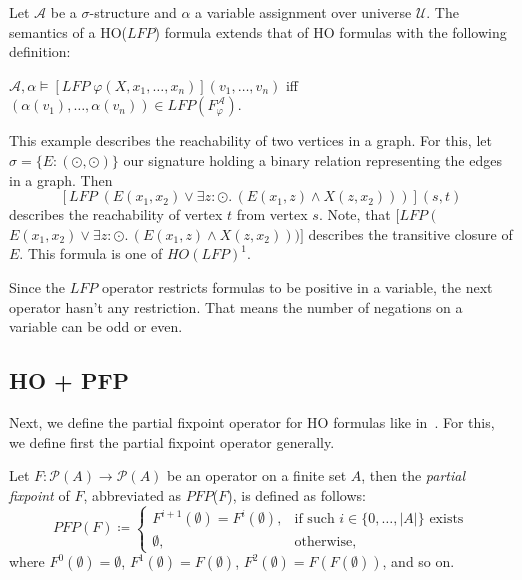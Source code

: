 \begin{definition}
    Let $\mathcal{A}$ be a $\sigma$-structure and $\alpha$ a variable assignment over universe $\mathcal{U}$. The
    semantics of a HO($\mathit{LFP}$) formula extends that of HO formulas with the following definition:
    \begin{compactitem}
        \item $\mathcal{A}, \alpha \models [\mathit{LFP}\;\varphi(X, x_1, \dots, x_n)](v_1, \dots,
        v_n)$ iff $(\alpha(v_1), \dots, \alpha(v_n)) \in \mathit{LFP}(F_\varphi^\mathcal{A})$.
    \end{compactitem}
\end{definition}

\begin{example}{\cite{freireMartins2011descriptive}}
    \label{example:ho_lfp} This example describes the reachability of two
    vertices in a graph. For this, let $\sigma = \{E\colon(\odot, \odot)\}$ our signature holding a binary relation
    representing the edges in a graph. Then
    \[[LFP\;(E(x_1, x_2) \vee \exists z\colon\odot.\,(E(x_1, z) \wedge X(z, x_2)))](s, t)\]
    describes the reachability of vertex $t$ from vertex $s$. Note, that $[LFP\;($ $E(x_1, x_2) \vee
    \exists z\colon\odot.\,(E(x_1, z) \wedge X(z, x_2)))]$ describes the transitive closure of $E$. This formula is
    one of $HO(LFP)^1$.
\end{example}

Since the $\mathit{LFP}$ operator restricts formulas to be positive in a variable, the next operator hasn't any
restriction. That means the number of negations on a variable can be odd or even.

\subsection{HO + PFP}\label{subsec:ho+Pfp}

Next, we define the partial fixpoint operator for HO formulas like in~\cite{schewe2006fixpoint}. For this, we define
first the partial fixpoint operator generally.

\begin{definition}
    Let $F\colon \mathscr{P}(A) \rightarrow \mathscr{P}(A)$ be an operator on a finite set $A$, then the \emph{partial
    fixpoint} of $F$, abbreviated as $\mathit{PFP}$($F$), is defined as follows:
    \[\mathit{PFP}(F)\coloneqq\begin{cases}
               F^{i+1}(\emptyset)=F^i(\emptyset),  & \text{if such } i \in \{0,\dots,|A|\} \text{ exists}\\
               \emptyset, & \text{otherwise,}
    \end{cases}\]
    where $F^0(\emptyset) = \emptyset$, $F^1(\emptyset) = F(\emptyset)$, $F^2(\emptyset) = F(F(\emptyset))$, and so on.
\end{definition}

